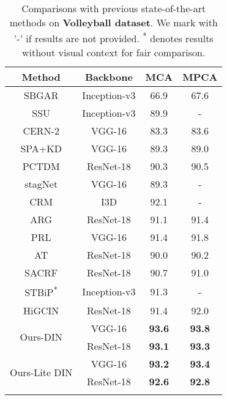 \documentclass[10pt,twocolumn,letterpaper]{article}
\begin{document}
\begin{table}[t]
  \small
  \centering
    \begin{tabular}{c|c|cc}
    \Xhline{1.0pt}
    Method & Backbone & MCA & MPCA \\
    \hline\hline
    SBGAR \cite{li2017sbgar} & Inception-v3 & 66.9  & 67.6  \\
    SSU \cite{bagautdinov2017social}   & Inception-v3 & 89.9  & - \\
    CERN-2 \cite{shu2017cern} & VGG-16 & 83.3  & 83.6  \\
    SPA+KD \cite{tang2018spa+kd} & VGG-16 & 89.3  & 89.0  \\
    PCTDM \cite{yan2018pctdm} & ResNet-18 & 90.3  & 90.5  \\
    stagNet \cite{qi2018stagnet} & VGG-16 & 89.3  & - \\
    CRM \cite{azar2019crm}   & I3D   & 92.1  & - \\
    ARG \cite{wu2019learning}  & ResNet-18 & 91.1  & 91.4  \\
    PRL \cite{hu2020prl}   & VGG-16 & 91.4  & 91.8  \\
AT \cite{gavrilyuk2020actor} & ResNet-18 & 90.0  & 90.2  \\
    SACRF \cite{pramono2020eccvempowering} & ResNet-18 & 90.7  & 91.0  \\
STBiP\textsuperscript{*} \cite{yuan2021learningcontext} & Inception-v3 & 91.3 & - \\
    HiGCIN \cite{yan2020higcin} & ResNet-18 & 91.4  & 92.0  \\
    \hline
    \multirow{2}[2]{*}{Ours-DIN} & VGG-16 & \textbf{93.6} & \textbf{93.8} \\
          & ResNet-18 & \textbf{93.1}  & \textbf{93.3}  \\
    \hline
    \multirow{2}[2]{*}{Ours-Lite DIN} & VGG-16 & \textbf{93.2} & \textbf{93.4} \\
          & ResNet-18 & \textbf{92.6}  & \textbf{92.8}  \\
    \Xhline{1.0pt}
    \end{tabular}\vspace{0.2cm}
  \caption{Comparisons with previous state-of-the-art methods on \textbf{Volleyball dataset}. We mark with '-' if results are not provided. \textsuperscript{*} denotes results without visual context for fair comparison.} \label{SOTA_Volleyball}\end{table}
\end{document}
